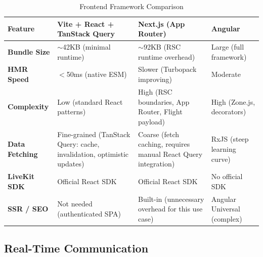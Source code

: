 \begin{table}[H]
    \caption{Frontend Framework Comparison}
    \centering
    \renewcommand{\arraystretch}{1.3}
    \begin{tabular}{|p{}|p{}|p{}|p{}|}
        \hline
        \textbf{Feature} & \textbf{Vite + React + TanStack Query} & \textbf{Next.js (App Router)} & \textbf{Angular} \\
        \hline
        \textbf{Bundle Size} & $\sim$42KB (minimal runtime) \cite{techsy2026vite} & $\sim$92KB (RSC runtime overhead) \cite{techsy2026vite} & Large (full framework) \\
        \textbf{HMR Speed} & $<$50ms (native ESM) \cite{hygraph2024vite} & Slower (Turbopack improving) \cite{hygraph2024vite} & Moderate \\
        \textbf{Complexity} & Low (standard React patterns) & High (RSC boundaries, App Router, Flight payload) \cite{northflank2024nextjs} & High (Zone.js, decorators) \\
        \textbf{Data Fetching} & Fine-grained (TanStack Query: cache, invalidation, optimistic updates) \cite{tanstack2024comparison} & Coarse (fetch caching, requires manual React Query integration) \cite{tanstack2024comparison} & RxJS (steep learning curve) \\
        \textbf{LiveKit SDK} & Official React SDK \cite{livekit2024sdk} & Official React SDK \cite{livekit2024sdk} & No official SDK \\
        \textbf{SSR / SEO} & Not needed (authenticated SPA) & Built-in (unnecessary overhead for this use case) & Angular Universal (complex) \\
        \hline
    \end{tabular}
\end{table}

\subsection{Real-Time Communication}

